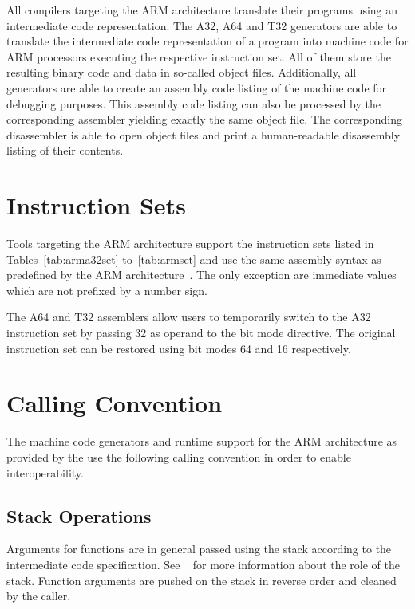 All compilers targeting the ARM architecture translate their programs using an intermediate code representation.
The A32, A64 and T32 generators are able to translate the intermediate code representation of a program into machine code for ARM processors executing the respective instruction set.
All of them store the resulting binary code and data in so-called object files.
Additionally, all generators are able to create an assembly code listing of the machine code for debugging purposes.
This assembly code listing can also be processed by the corresponding assembler yielding exactly the same object file.
The corresponding disassembler is able to open object files and print a human-readable disassembly listing of their contents.
\seeobject\seecode

\section{Instruction Sets}

Tools targeting the ARM architecture support the instruction sets listed in Tables~\ref{tab:arma32set} to~\ref{tab:armset} and use the same assembly syntax as predefined by the ARM architecture~\cite{arm:instructionset}.
The only exception are immediate values which are not prefixed by a number sign.
\seeassembly


The A64 and T32 assemblers allow users to temporarily switch to the A32 instruction set by passing 32 as operand to the bit mode directive.
The original instruction set can be restored using bit modes 64 and 16 respectively.

\section{Calling Convention}

The machine code generators and runtime support for the ARM architecture as provided by the \ecs{} use the following calling convention in order to enable interoperability.

\subsection{Stack Operations}

Arguments for functions are in general passed using the stack according to the intermediate code specification.
See \Documentation{}~ for more information about the role of the stack.
Function arguments are pushed on the stack in reverse order and cleaned by the caller.

